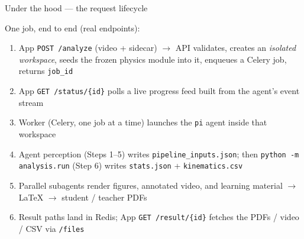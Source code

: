 \documentclass[aspectratio=169,10pt]{beamer}
\begin{document}
\begin{frame}{Under the hood --- the request lifecycle}
\centering
{}
\vspace{0.4em}
\flushleft \footnotesize One job, end to end (real endpoints):
\begin{enumerate}\setlength\itemsep{1.5pt}\footnotesize
  \item App \texttt{POST /analyze} (video + sidecar) $\to$ API validates, creates an \emph{isolated workspace}, seeds the frozen physics module into it, enqueues a Celery job, returns \texttt{job\_id}
  \item App \texttt{GET /status/\{id\}} polls a live progress feed built from the agent's event stream
  \item Worker (Celery, \alert{one job at a time}) launches the \texttt{pi} agent inside that workspace
  \item Agent perception (Steps 1--5) writes \texttt{pipeline\_inputs.json}; then \texttt{python -m analysis.run} (Step 6) writes \texttt{stats.json} + \texttt{kinematics.csv}
  \item Parallel subagents render figures, annotated video, and learning material $\to$ LaTeX $\to$ student / teacher PDFs
  \item Result paths land in Redis; App \texttt{GET /result/\{id\}} fetches the PDFs / video / CSV via \texttt{/files}
\end{enumerate}
\end{frame}
\end{document}
